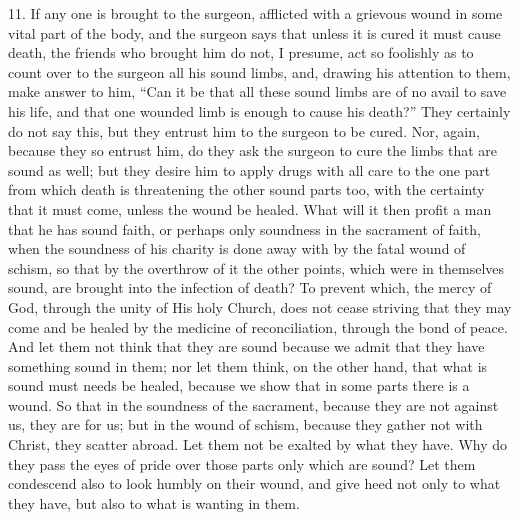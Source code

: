 11. If any one is brought to the surgeon, afflicted with a grievous wound in some vital part of the body, and the surgeon says that unless it is cured it must cause death, the friends who brought him do not, I presume, act so foolishly as to count over to the surgeon all his sound limbs, and, drawing his attention to them, make answer to him, ``Can it be that all these sound limbs are of no avail to save his life, and that one wounded limb is enough to cause his death?'' They certainly do not say this, but they entrust him to the surgeon to be cured. Nor, again, because they so entrust him, do they ask the surgeon to cure the limbs that are sound as well; but they desire him to apply drugs with all care to the one part from which death is threatening the other sound parts too, with the certainty that it must come, unless the wound be healed. What will it then profit a man that he has sound faith, or perhaps only soundness in the sacrament of faith, when the soundness of his charity is done away with by the fatal wound of schism, so that by the overthrow of it the other points, which were in themselves sound, are brought into the infection of death? To prevent which, the mercy of God, through the unity of His holy Church, does not cease striving that they may come and be healed by the medicine of reconciliation, through the bond of peace. And let them not think that they are sound because we admit that they have something sound in them; nor let them think, on the other hand, that what is sound must needs be healed, because we show that in some parts there is a wound. So that in the soundness of the sacrament, because they are not against us, they are for us; but in the wound of schism, because they gather not with Christ, they scatter abroad. Let them not be exalted by what they have. Why do they pass the eyes of pride over those parts only which are sound? Let them condescend also to look humbly on their wound, and give heed not only to what they have, but also to what is wanting in them.


